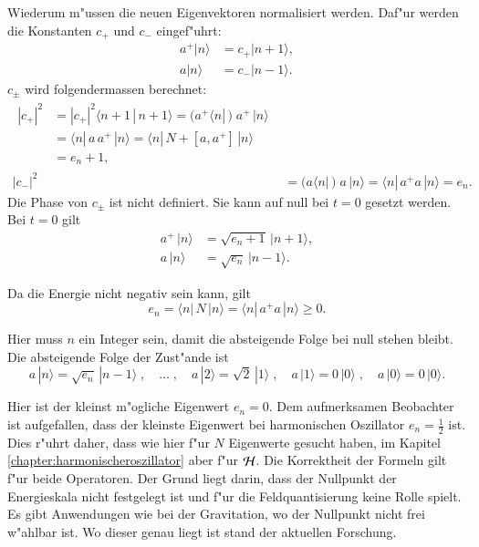Wiederum m"ussen die neuen Eigenvektoren normalisiert werden. Daf"ur werden die Konstanten $c_+$ und $c_-$ eingef"uhrt:
\begin{align*}
a^+|n\rangle &= c_+|n+1\rangle, \\
a|n\rangle &= c_-|n-1\rangle.
\end{align*}
$c_\pm$ wird folgendermassen berechnet:
\begin{align*}
\begin{split}
	|c_+|^2 &= |c_+|^2 \langle n+1 \, | \, n+1 \rangle = ( a^+ \langle n |\,) \; a^+ \,| n \rangle \\
		&= \langle n |\, a \, a^+ \,|n \rangle = \langle n |\, N + [a,a^+] \,|n \rangle \\
		&= e_n+1,
\end{split}\\
	|c_-|^2 &= 	( a \langle n |\,) \; a \,| n \rangle = \langle n |\, a^+ a \,| n \rangle = e_n.
\end{align*}
Die Phase von $c_{\pm}$ ist nicht definiert. Sie kann auf null bei $t=0$ gesetzt werden. Bei $t=0$ gilt
\begin{align*}
a^+\,|n\rangle &= \sqrt{e_n+1}\,|n+1\rangle, \\
a\,|n\rangle &= \sqrt{e_n}\,|n-1\rangle.
\end{align*}

Da die Energie nicht negativ sein kann, gilt
\begin{equation*}
e_n = \langle n |\, N \,|n \rangle = \langle n |\, a^+a \,|n \rangle \geq 0.
\end{equation*}

Hier muss $n$ ein Integer sein, damit die absteigende Folge bei null stehen bleibt. Die absteigende Folge der Zust"ande ist
\begin{equation*}
a\,|n\rangle = \sqrt{e_n}\,|n-1\rangle  \;, \quad \hdots \; , \quad a\,|2\rangle = \sqrt{2}\,|1\rangle \; , \quad a\,|1\rangle = 0\,|0\rangle \;, \quad a\,|0\rangle = 0\,|0\rangle.
\end{equation*}

Hier ist der kleinst m"ogliche Eigenwert $e_n = 0$. Dem aufmerksamen Beobachter ist aufgefallen, dass der kleinste Eigenwert bei harmonischen Oszillator $e_n = \frac{1}{2}$ ist. Dies r"uhrt daher, dass wie hier f"ur $N$ Eigenwerte gesucht haben, im Kapitel \ref{chapter:harmonischeroszillator} aber f"ur ${\cal H}$. Die Korrektheit der Formeln gilt f"ur beide Operatoren. Der Grund liegt darin, dass der Nullpunkt der Energieskala nicht festgelegt ist und f"ur die Feldquantisierung keine Rolle spielt. Es gibt Anwendungen wie bei der Gravitation, wo der Nullpunkt nicht frei w"ahlbar ist. Wo dieser genau liegt ist stand der aktuellen Forschung.


